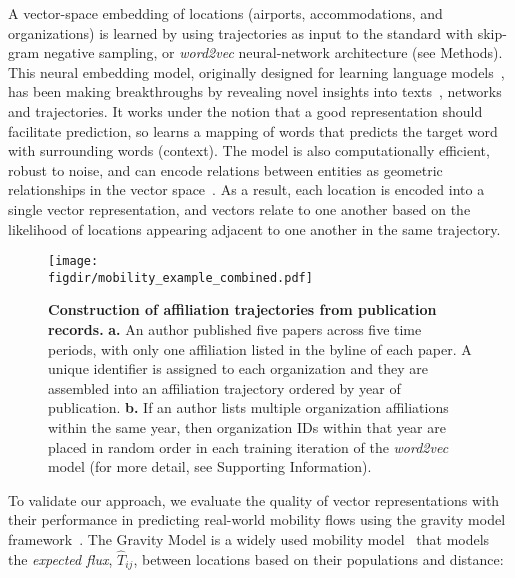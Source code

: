\documentclass[12pt]{article} %
\def\figdir{../Figs}
\def\SI{Supporting Information}
\begin{document}
A vector-space embedding of locations (airports, accommodations, and organizations) is learned by using trajectories as input to the standard with skip-gram negative sampling, or \textit{word2vec} neural-network architecture (see Methods).
This neural embedding model, originally designed for learning language models~\autocite{mikolov2013word2vec}, has been making breakthroughs by revealing novel insights into texts~\autocite{tshitoyan2019mat2vec, garg2018gender, kozlowski2018geometry, hamilton2016diachronic, le2014doc2vec, nakandala2017gendered}, networks~\autocite{grover2016node2vec, linzhuo2020hyperbolic} and trajectories\autocite{liu2016exploring, feng2017poi2vec, yao2018representing, cao2019habit2vec, crivellari2019motion, solomon2018predict}.
It works under the notion that a good representation should facilitate prediction,  so learns a mapping of words that predicts the target word with surrounding words (context).
The model is also computationally efficient, robust to noise, and can encode relations between entities as geometric relationships in the vector space~\autocite{levy2014neural, nakandala2017gendered, kozlowski2018geometry, an2018semaxis}.
As a result, each location is encoded into a single vector representation, and vectors relate to one another based on the likelihood of locations appearing adjacent to one another in the same trajectory.


%
%
\begin{figure}[ht!]
	\centering
	\texttt{[image: \\figdir/mobility\_example\_combined.pdf]}
	\caption{
		\textbf{Construction of affiliation trajectories from publication records.}
		\textbf{a.}
		An author published five papers across five time periods, with only one affiliation listed in the byline of each paper.
		A unique identifier is assigned to each organization and they are assembled into an affiliation trajectory ordered by year of publication.
		\textbf{b.}
		If an author lists multiple organization affiliations within the same year, then organization IDs within that year are placed in random order in each training iteration of the \textit{word2vec} model (for more detail, see \SI).
	}
	\label{fig:methods:mobility_sentence}
\end{figure}


To validate our approach, we evaluate the quality of vector representations with their performance in predicting real-world mobility flows using the gravity model framework~\autocite{zipf1946gravity}.
The Gravity Model is a widely used mobility model~\autocite{curiel2018citygravity, jung2008highwaygravity, hong2016busgravity, truscott2012epidemicgravity} that models the \textit{expected flux}, $\hat{T}_{ij}$, between locations based on their populations and distance:
\end{document}
